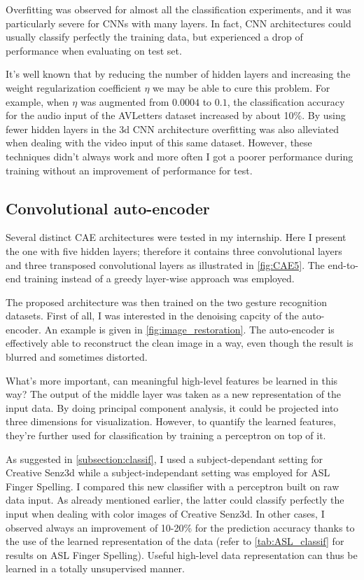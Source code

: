 Overfitting was observed for almost all the classification
experiments, and it was particularly severe for
CNNs with many layers.
In fact, CNN architectures could usually classify
perfectly the training data, but experienced a drop of performance
when evaluating on test set.

It's well known that by reducing the number of hidden layers and
increasing the weight regularization coefficient $\eta$ we may
be able to cure this problem.
For example, when $\eta$ was augmented from $0.0004$ to $0.1$,
the classification accuracy for the audio input of the AVLetters
dataset increased by about 10\%.
By using fewer hidden layers in the 3d CNN architecture overfitting
was also alleviated when dealing with the video input of this same dataset.
However, these techniques didn't always work
and more often I got a poorer performance during training without
an improvement of performance for test.

\subsection{Convolutional auto-encoder} \label{subsection:CAE}

Several distinct CAE architectures were tested in my internship.
Here I present the one with five hidden layers; therefore it contains
three convolutional layers and three transposed convolutional layers
as illustrated in \autoref{fig:CAE5}. The end-to-end training instead of
a greedy layer-wise approach was employed.

The proposed architecture was then trained on the two gesture recognition
datasets. First of all, I was interested in the denoising capcity of
the auto-encoder. An example is given in \autoref{fig:image_restoration}.
The auto-encoder is effectively able to reconstruct the clean image in
a way, even though the result is blurred and sometimes distorted.

What's more important, can meaningful high-level features be
learned in this way? The output of the middle layer was taken as a
new representation of the input data.
By doing principal component analysis, it could be projected into
three dimensions for visualization.
However, to quantify the learned features, they're further used for
classification by training a perceptron on top of it.

As suggested in \ref{subsection:classif}, I used a subject-dependant setting
for Creative Senz3d while a subject-independant setting was employed
for ASL Finger Spelling. I compared this new classifier with a
perceptron built on raw data input. As already mentioned earlier, the
latter could classify perfectly the input when dealing with color images
of Creative Senz3d. In other cases, I observed always an improvement
of 10-20\% for the prediction accuracy thanks to the use of the
learned representation of the data (refer to \autoref{tab:ASL_classif}
for results on ASL Finger Spelling). Useful high-level data representation
can thus be learned in a totally unsupervised manner.

